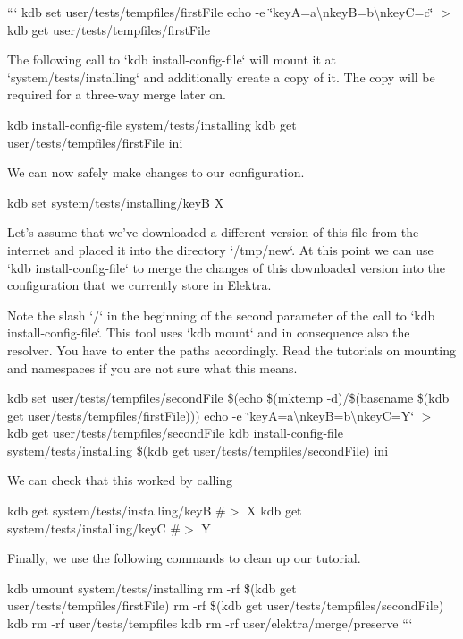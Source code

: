 ``` kdb set user/tests/tempfiles/first\+File  echo -\/e \char`\"{}key\+A=a\textbackslash{}nkey\+B=b\textbackslash{}nkey\+C=c\char`\"{} $>$ {\ttfamily kdb get user/tests/tempfiles/first\+File} 
\begin{DoxyCode}
The following call to `kdb install-config-file` will mount it at `system/tests/installing` and additionally
       create a copy of it.
The copy will be required for a three-way merge later on.
\end{DoxyCode}
 kdb install-\/config-\/file system/tests/installing {\ttfamily kdb get user/tests/tempfiles/first\+File} ini 
\begin{DoxyCode}
We can now safely make changes to our configuration.
\end{DoxyCode}
 kdb set system/tests/installing/keyB X 
\begin{DoxyCode}
Let's assume that we've downloaded a different version of this file from the internet and placed it into
       the directory `/tmp/new`.
At this point we can use `kdb install-config-file` to merge the changes of this downloaded version into the
       configuration that we currently store in Elektra.

Note the slash `/` in the beginning of the second parameter of the call to `kdb install-config-file`.
This tool uses `kdb mount` and in consequence also the resolver.
You have to enter the paths accordingly.
Read the tutorials on mounting and namespaces if you are not sure what this means.
\end{DoxyCode}
 kdb set user/tests/tempfiles/second\+File \$(echo \$(mktemp -\/d)/\$(basename \$(kdb get user/tests/tempfiles/first\+File))) echo -\/e \char`\"{}key\+A=a\textbackslash{}nkey\+B=b\textbackslash{}nkey\+C=\+Y\char`\"{} $>$ {\ttfamily kdb get user/tests/tempfiles/second\+File} kdb install-\/config-\/file system/tests/installing \$(kdb get user/tests/tempfiles/second\+File) ini 
\begin{DoxyCode}
We can check that this worked by calling
\end{DoxyCode}
 kdb get system/tests/installing/keyB \#$>$ X kdb get system/tests/installing/keyC \#$>$ Y 
\begin{DoxyCode}
Finally, we use the following commands to clean up our tutorial.
\end{DoxyCode}
 kdb umount system/tests/installing rm -\/rf \$(kdb get user/tests/tempfiles/first\+File) rm -\/rf \$(kdb get user/tests/tempfiles/second\+File) kdb rm -\/rf user/tests/tempfiles kdb rm -\/rf user/elektra/merge/preserve ``` 